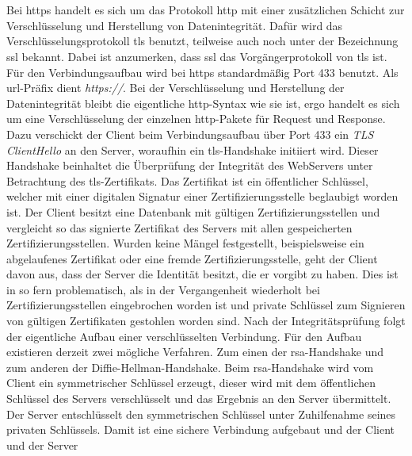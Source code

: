 \documentclass[titlepage]{report}
\begin{document}
\section*{}
Bei \gls{https} handelt es sich um das Protokoll \gls{http} mit einer
zusätzlichen Schicht zur Verschlüsselung und Herstellung von
Datenintegrität. Dafür wird das Verschlüsselungsprotokoll \gls{tls}
benutzt, teilweise auch noch unter der Bezeichnung \gls{ssl} bekannt.
Dabei ist anzumerken, dass \gls{ssl} das Vorgängerprotokoll von
\gls{tls} ist.
Für den Verbindungsaufbau wird bei \gls{https} standardmäßig
Port 433 benutzt\cite[Siehe Section 2.3]{RFC2818}. Als
\gls{url}\hyp{}Präfix dient \emph{https://}. Bei der Verschlüsselung und
Herstellung der Datenintegrität bleibt die eigentliche
\gls{http}\hyp{}Syntax wie sie ist, ergo handelt es sich um eine Verschlüsselung der
einzelnen \gls{http}\hyp{}Pakete für Request und Response. Dazu verschickt der Client beim
Verbindungsaufbau über Port 433 ein \emph{TLS ClientHello} an den
Server, woraufhin ein \gls{tls}\hyp{}Handshake initiiert wird.
Dieser Handshake beinhaltet die Überprüfung der Integrität des WebServers
unter Betrachtung des \gls{tls}\hyp{}Zertifikats. Das Zertifikat ist
ein öffentlicher Schlüssel, welcher mit einer
digitalen Signatur einer Zertifizierungsstelle beglaubigt worden ist.
Der Client besitzt eine Datenbank mit gültigen Zertifizierungsstellen
und vergleicht so das signierte Zertifikat des Servers mit allen
gespeicherten Zertifizierungsstellen. Wurden keine Mängel
festgestellt, beispielsweise ein abgelaufenes Zertifikat oder eine
fremde Zertifizierungsstelle, geht der Client davon aus, dass der Server
die Identität besitzt, die er vorgibt zu haben. Dies ist in so fern
problematisch, als in der Vergangenheit wiederholt bei
Zertifizierungsstellen eingebrochen worden ist und private Schlüssel zum
Signieren von gültigen Zertifikaten gestohlen worden
sind\cite{PRIVATEKEYSSTOLEN}. Nach der Integritätsprüfung folgt der
eigentliche Aufbau einer verschlüsselten Verbindung. Für den Aufbau
existieren derzeit zwei mögliche Verfahren. Zum einen der
\gls{rsa}\hyp{}Handshake und zum anderen der
Diffie\hyp{}Hellman\hyp{}Handshake\cite{TLS}. Beim
\gls{rsa}\hyp{}Handshake wird vom Client ein symmetrischer Schlüssel
erzeugt, dieser wird mit dem öffentlichen Schlüssel des Servers
verschlüsselt und das Ergebnis an den Server übermittelt. Der Server entschlüsselt den
symmetrischen Schlüssel unter Zuhilfenahme seines privaten Schlüssels.
Damit ist eine sichere Verbindung aufgebaut und der Client und der Server
\end{document}
